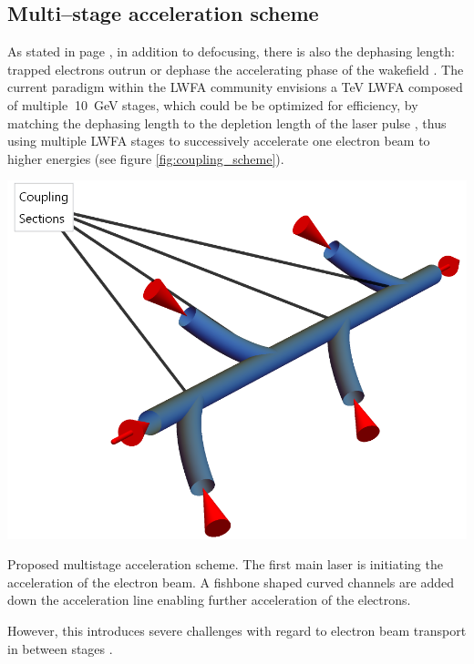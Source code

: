 \documentclass[../main.tex]{subfiles}
\begin{document}
\subsection{Multi--stage acceleration scheme}

As stated in page \pageref{dephasing-length}, in addition to defocusing, there is also the dephasing length: trapped electrons outrun or dephase the accelerating phase of the wakefield \cite{Esarey2009PhysicsAccelerators}. The current paradigm within the LWFA community envisions a \si{\TeV} LWFA composed of multiple $~$\SI{10}{\GeV} stages, which could be be optimized for efficiency, by matching the dephasing length to the depletion length of the laser pulse \cite{Schroeder2010PhysicsColliders}, thus using multiple LWFA stages to successively accelerate one electron beam to higher energies (see figure \ref{fig:coupling_scheme}).
\begin{marginfigure}
\includegraphics[width=\marginparwidth]{figures/coupling_scheme.png}
\caption{Proposed multistage acceleration scheme. The first main laser is initiating the acceleration of the electron beam. A fishbone shaped curved channels are added down the acceleration line enabling further acceleration of the electrons.}
\label{fig:coupling_scheme}
\end{marginfigure}
However, this introduces severe challenges with regard to electron beam transport in between stages \cite{Esarey2009PhysicsAccelerators}.
\end{document}
